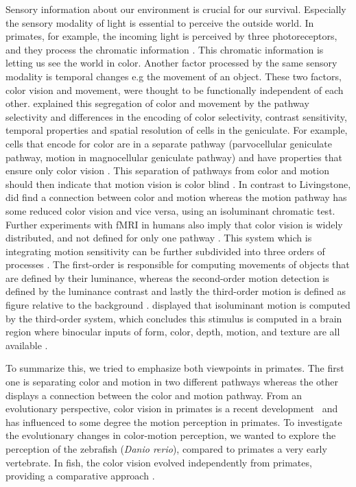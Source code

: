 
Sensory information about our environment is crucial for our survival. Especially the sensory modality of light is essential to perceive the outside world. In primates, for example, the incoming light is perceived by three photoreceptors, and they process the chromatic information \parencite{robert1977retinalcones}. This chromatic information is letting us see the world in color. Another factor processed by the same sensory modality is temporal changes e.g the movement of an object. These two factors, color vision and movement, were thought to be functionally independent of each other. \cite{margaret1988segregationcolormovement} explained this segregation of color and movement by the pathway selectivity and differences in the encoding of \glqq color selectivity, contrast sensitivity, temporal properties and spatial resolution\grqq{} \parencite{margaret1988segregationcolormovement} of cells in the geniculate. For example, cells that encode for color are in a separate pathway (parvocellular geniculate pathway, motion in magnocellular geniculate pathway) and have properties that ensure only color vision \parencite{margaret1988segregationcolormovement}. This separation of pathways from color and motion should then indicate that motion vision is color blind \parencite{MULLEN1992colormotion}. In contrast to Livingstone, \cite{MULLEN1992colormotion} did find a connection between color and motion whereas the motion pathway has some reduced color vision and vice versa, using an isoluminant chromatic test. Further experiments with fMRI in humans also imply that color vision is widely distributed, and not defined for only one pathway \parencite{WANDELL1999fmricolor}. This system which is integrating motion sensitivity can be further subdivided into three orders of processes \parencite{zhong1999isoluminant}. The first-order is responsible for computing movements of objects that are defined by their luminance, whereas the second-order motion detection is defined by the luminance contrast and lastly the third-order motion is defined as figure relative to the background \parencite{zhong1999isoluminant}. \cite{zhong1999isoluminant} displayed that isoluminant motion is computed by the third-order system, which concludes this stimulus is computed in a brain region where \glqq binocular inputs of form, color, depth, motion, and texture are all available \grqq{} \parencite{zhong1999isoluminant}. 

\vspace{\baselineskip}

To summarize this, we tried to emphasize both viewpoints in primates. The first one is separating color and motion in two different pathways whereas the other displays a connection between the color and motion pathway. From an evolutionary perspective, color vision in primates is a recent development \parencite{yokoyama2001colorvisongen} and has influenced to some degree the motion perception in primates. To investigate the evolutionary changes in color-motion perception, we wanted to explore the perception of the zebrafish (\textit{Danio rerio}), compared to primates a very early vertebrate. In fish, the color vision evolved independently from primates, providing a comparative approach \parencite{nigel1967fishretina}. 

